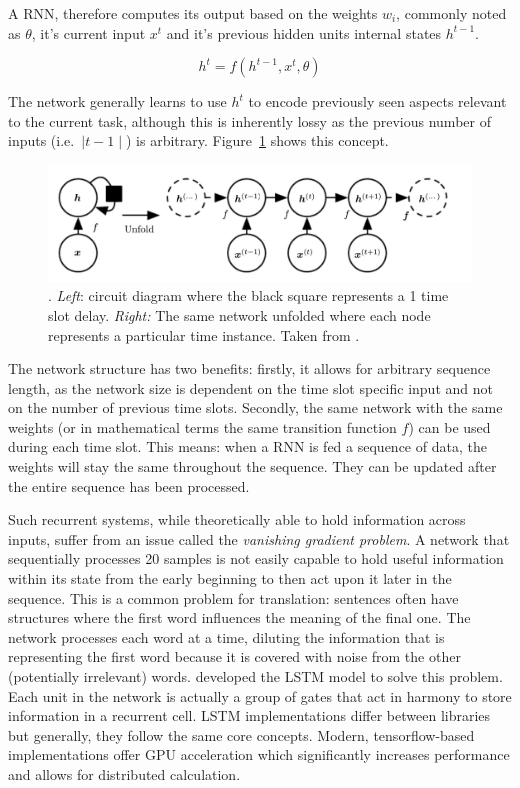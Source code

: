 A \ac{RNN}, therefore computes its output based on the weights $w_i$, commonly noted as $\theta$, it's current input
$x^t$ and it's previous hidden units internal states $h^{t-1}$.

\begin{equation}
    h^t = f(h^{t-1}, x^t, \theta)
\end{equation}

The network generally learns to use $h^t$ to encode previously seen aspects relevant to the current task, although this
is inherently lossy as the previous number of inputs (i.e.\ $\mid t-1\mid$) is arbitrary. Figure~\ref{fig:rnn_concept}
shows this concept.

\begin{figure}[]
    \centering
    \includegraphics[width=0.8\linewidth]{img/rnn_concept.png}
    \caption[Recurrent Neural Network conceptualized]{. \emph{Left}: circuit diagram where the black square represents a
        1 time slot delay. \emph{Right:} The same network unfolded where each node represents a particular time instance.
    Taken from \citet{Goodfellow-et-al-2016}.}
    \label{fig:rnn_concept}
\end{figure}

The network structure has two benefits: firstly, it allows for arbitrary sequence length, as the network size is
dependent on the time slot specific input and not on the number of previous time slots. Secondly, the same network with
the same weights (or in mathematical terms the same transition function $f$) can be used during each time slot. This
means: when a \ac{RNN} is fed a sequence of data, the weights will stay the same throughout the sequence. They can be
updated after the entire sequence has been processed.

Such recurrent systems, while theoretically able to hold information across inputs, suffer from an issue called the
\emph{vanishing gradient problem}. A network that sequentially processes 20 samples is not easily capable to hold useful
information within its state from the early beginning to then act upon it later in the sequence. This is a common
problem for translation: sentences often have structures where the first word influences the meaning of the final one.
The network processes each word at a time, diluting the information that is representing the first word because it
is covered with noise from the other (potentially irrelevant) words. \citet{Hochreiter:1997:LSM:1246443.1246450}
developed the \ac{LSTM} model to solve this problem. Each unit in the network is actually a group of gates that act in
harmony to store information in a recurrent cell. \ac{LSTM} implementations differ between libraries but generally, they
follow the same core concepts. Modern, tensorflow-based implementations offer \ac{GPU} acceleration which significantly
increases performance and allows for distributed calculation.


